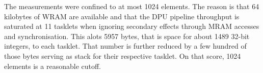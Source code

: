 The measurements were confined to at most 1024 elements.
The reason is that 64 kilobytes of WRAM are available and that the DPU pipeline throughput is saturated at 11 tasklets when ignoring secondary effects through MRAM accesses and synchronisation.
This alots 5957 bytes, that is space for about 1489 32-bit integers, to each tasklet.
That number is further reduced by a few hundred of those bytes serving as stack for their respective tasklet.
On that score, 1024 elements is a reasonable cutoff.

\clearpage


\clearpage


\clearpage


\clearpage


\clearpage


\clearpage

